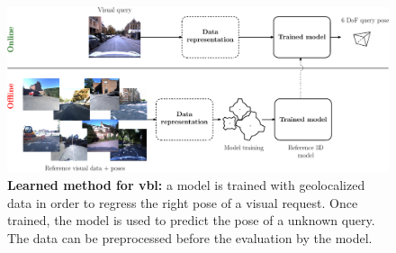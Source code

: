 \begin{figure}[t]
	\centering

	\includegraphics[width=\linewidth]{methods/learned_method}
	\caption[Learned method]{\label{fig:learned_method}\textbf{Learned method for \acs{vbl}:} a model is trained with geolocalized data in order to regress the right pose of a visual request. Once trained, the model is used to predict the pose of a unknown query. The data can be preprocessed before the evaluation by the model.}
\end{figure}
